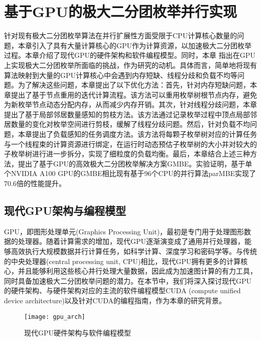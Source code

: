 \chapter{基于GPU的极大二分团枚举并行实现}
\label{ch:gmbe}

针对现有极大二分团枚举算法在并行扩展性方面受限于CPU计算核心数量的问题，本章引入了具有大量计算核心的GPU作为计算资源，以加速极大二分团枚举过程。本章介绍了现代GPU的硬件架构和软件编程模型。同时，本章%
指出在GPU上实现极大二分团枚举所面临的挑战，作为研究的动机。具体而言，简单地将现有算法映射到大量的GPU计算核心中会遇到内存短缺、线程分歧和负载不均等问题。为了解决这些问题，本章提出了以下优化方法：首先，针对内存短缺问题，本章提出了基于节点重用的迭代计算流程。该方法可以重用枚举树根节点内存，避免为新枚举节点动态分配内存，从而减少内存开销。其次，针对线程分歧问题，本章提出了基于局部邻居数量感知的剪枝方法。该方法通过记录枚举过程中顶点局部邻居数量的变化对枚举空间进行剪枝，缓解了线程分歧问题。然后，针对负载不均问题，本章提出了负载感知的任务调度方法。该方法将每颗子枚举树对应的计算任务与一个线程束的计算资源进行绑定，在运行时动态预估子枚举树的大小并对较大的子枚举树进行进一步拆分，实现了细粒度的负载均衡。最后，本章结合上述三种方法，提出了基于GPU的高效极大二分团枚举解决方案GMBE。实验证明，基于单个NVIDIA A100 GPU的GMBE相比现有基于96个CPU的并行算法parMBE实现了70.6倍的性能提升。

\section{现代GPU架构与编程模型} 
\label{sec:gpu_arch}
GPU，即图形处理单元(Graphics Processing Unit)，最初是专门用于处理图形数据的处理器。随着计算需求的增加，现代GPU逐渐演变成了通用并行处理器，能够高效执行大规模数据并行计算任务，如科学计算、深度学习和密码学等。与传统的中央处理器(central processing unit, CPU)相比，现代GPU拥有更多的计算核心，并且能够利用这些核心并行处理大量数据，因此成为加速图计算的有力工具，同时具备加速极大二分团枚举问题的潜力。在本节中，我们将深入探讨现代GPU的硬件架构、与硬件架构对应的主流的软件编程模型CUDA (compute unified device architecture)以及针对CUDA的编程指南，作为本章的研究背景。

\begin{figure} [t]
  \center
    \vspace{0.1in}
		\texttt{[image: gpu\_arch]}
    \vspace{0.1in}
	\caption{现代GPU硬件架构与软件编程模型}
	\label{fig:gpu}
\end{figure}

